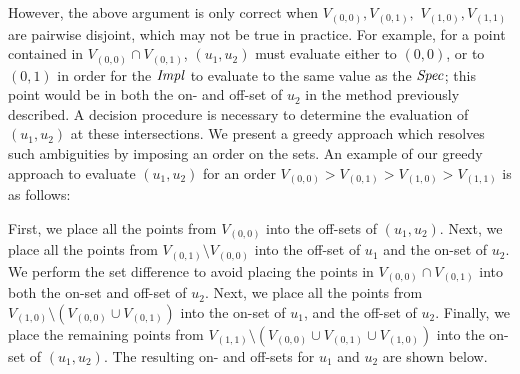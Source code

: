 However, the above argument is only correct when $V_{(0,0)}, V_{(0,1)}, $ $ V_{(1,0)}, V_{(1,1)}$ are pairwise disjoint, which may not be true in practice. For example, for a point contained in $V_{(0,0)} \cap V_{(0,1)}$, $(u_1,u_2)$ must evaluate either to $(0,0)$, or to $(0,1)$ in order for the ${\it Impl}$ to evaluate to the same value as the ${\it Spec}$; this point would be in both the on- and off-set of $u_2$ in the method previously described. A decision procedure is necessary to determine the evaluation of $(u_1,u_2)$ at these intersections. 
We present a greedy approach which resolves such ambiguities by imposing an order on the sets.
An example of our greedy approach to evaluate $(u_1,u_2)$ for an order $V_{(0,0)} > V_{(0,1)} > V_{(1,0)} > V_{(1,1)}$ is as follows:


First, we place all the points from $V_{(0,0)}$ into the off-sets of $(u_1, u_2)$. Next, we place all the points from $V_{(0,1)} \setminus V_{(0,0)}$ into the off-set of $u_1$ and the on-set of $u_2$. We perform the set difference to avoid placing the points in $V_{(0,0)} \cap V_{(0,1)}$ into both the on-set and off-set of $u_2$. Next, we place all the points from $V_{(1,0)} \setminus (V_{(0,0)} \cup V_{(0,1)})$ into the on-set of $u_1$, and the off-set of $u_2$. Finally, we place the remaining points from $V_{(1,1)} \setminus (V_{(0,0)} \cup V_{(0,1)} \cup V_{(1,0)})$ into the on-set of $(u_1, u_2)$.
The resulting on- and off-sets for $u_1$ and $u_2$ are shown below.

